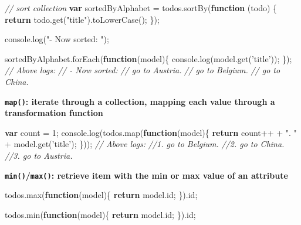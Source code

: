 \documentclass[9pt]{book}
\newenvironment{Shaded}{}{}
\newcommand{\KeywordTok}[1]{\textcolor[rgb]{0.00,0.44,0.13}{\textbf{{#1}}}}
\newcommand{\DecValTok}[1]{\textcolor[rgb]{0.25,0.63,0.44}{{#1}}}
\newcommand{\StringTok}[1]{\textcolor[rgb]{0.25,0.44,0.63}{{#1}}}
\newcommand{\CommentTok}[1]{\textcolor[rgb]{0.38,0.63,0.69}{\textit{{#1}}}}
\newcommand{\OtherTok}[1]{\textcolor[rgb]{0.00,0.44,0.13}{{#1}}}
\newcommand{\FunctionTok}[1]{\textcolor[rgb]{0.02,0.16,0.49}{{#1}}}
\newcommand{\NormalTok}[1]{{#1}}
\begin{document}
\begin{Shaded}
\begin{Highlighting}[]
\CommentTok{// sort collection}
\KeywordTok{var} \NormalTok{sortedByAlphabet = }\OtherTok{todos}\NormalTok{.}\FunctionTok{sortBy}\NormalTok{(}\KeywordTok{function} \NormalTok{(todo) \{}
    \KeywordTok{return} \OtherTok{todo}\NormalTok{.}\FunctionTok{get}\NormalTok{(}\StringTok{"title"}\NormalTok{).}\FunctionTok{toLowerCase}\NormalTok{();}
\NormalTok{\});}

\OtherTok{console}\NormalTok{.}\FunctionTok{log}\NormalTok{(}\StringTok{"- Now sorted: "}\NormalTok{);}

\OtherTok{sortedByAlphabet}\NormalTok{.}\FunctionTok{forEach}\NormalTok{(}\KeywordTok{function}\NormalTok{(model)\{}
  \OtherTok{console}\NormalTok{.}\FunctionTok{log}\NormalTok{(}\OtherTok{model}\NormalTok{.}\FunctionTok{get}\NormalTok{(}\StringTok{'title'}\NormalTok{));}
\NormalTok{\});}
\CommentTok{// Above logs:}
\CommentTok{// - Now sorted:}
\CommentTok{// go to Austria.}
\CommentTok{// go to Belgium.}
\CommentTok{// go to China.}
\end{Highlighting}
\end{Shaded}

\textbf{\texttt{map()}: iterate through a collection, mapping each value
through a transformation function}

\begin{Shaded}
\begin{Highlighting}[]
\KeywordTok{var} \NormalTok{count = }\DecValTok{1}\NormalTok{;}
\OtherTok{console}\NormalTok{.}\FunctionTok{log}\NormalTok{(}\OtherTok{todos}\NormalTok{.}\FunctionTok{map}\NormalTok{(}\KeywordTok{function}\NormalTok{(model)\{}
  \KeywordTok{return} \NormalTok{count++ + }\StringTok{". "} \NormalTok{+ }\OtherTok{model}\NormalTok{.}\FunctionTok{get}\NormalTok{(}\StringTok{'title'}\NormalTok{);}
\NormalTok{\}));}
\CommentTok{// Above logs:}
\CommentTok{//1. go to Belgium.}
\CommentTok{//2. go to China.}
\CommentTok{//3. go to Austria.}
\end{Highlighting}
\end{Shaded}

\textbf{\texttt{min()}/\texttt{max()}: retrieve item with the min or max
value of an attribute}

\begin{Shaded}
\begin{Highlighting}[]
\OtherTok{todos}\NormalTok{.}\FunctionTok{max}\NormalTok{(}\KeywordTok{function}\NormalTok{(model)\{}
  \KeywordTok{return} \OtherTok{model}\NormalTok{.}\FunctionTok{id}\NormalTok{;}
\NormalTok{\}).}\FunctionTok{id}\NormalTok{;}

\OtherTok{todos}\NormalTok{.}\FunctionTok{min}\NormalTok{(}\KeywordTok{function}\NormalTok{(model)\{}
  \KeywordTok{return} \OtherTok{model}\NormalTok{.}\FunctionTok{id}\NormalTok{;}
\NormalTok{\}).}\FunctionTok{id}\NormalTok{;}
\end{Highlighting}
\end{Shaded}
\end{document}
